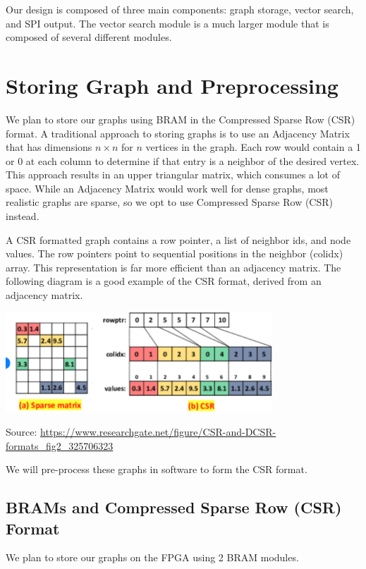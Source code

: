 \documentclass{article}
\begin{document}
Our design is composed of three main components: graph storage, vector search, and SPI output. The vector search module is a much larger module that is composed of several different modules.


\section{Storing Graph and Preprocessing}

We plan to store our graphs using BRAM in the Compressed Sparse Row (CSR) format. A traditional approach to storing graphs is to use an Adjacency Matrix that has dimensions $n\times n$ for $n$ vertices in the graph. Each row would contain a 1 or 0 at each column to determine if that entry is a neighbor of the desired vertex. This approach results in an upper triangular matrix, which consumes a lot of space. While an Adjacency Matrix would work well for dense graphs, most realistic graphs are sparse, so we opt to use Compressed Sparse Row (CSR) instead.

A CSR formatted graph contains a row pointer, a list of neighbor ids, and node values. The row pointers point to sequential positions in the neighbor (colidx) array. This representation is far more efficient than an adjacency matrix. The following diagram is a good example of the CSR format, derived from an adjacency matrix.

\includegraphics[width=10cm]{csr_eg.png}

Source: \href{https://www.researchgate.net/figure/CSR-and-DCSR-formats_fig2_325706323}{https://www.researchgate.net/figure/CSR-and-DCSR-formats\_fig2\_325706323}

We will pre-process these graphs in software to form the CSR format. 

\subsection{BRAMs and Compressed Sparse Row (CSR) Format}

We plan to store our graphs on the FPGA using 2 BRAM modules. 
\end{document}
